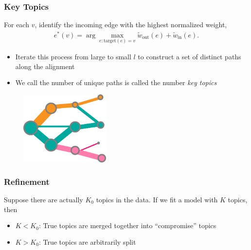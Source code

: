 \documentclass[hyperref={colorlinks=true, linkcolor=violet, citecolor=SeaGreen}]{beamer}
\begin{document}
\begin{frame}
  \frametitle{Key Topics}
  For each $v$, identify the incoming edge with the highest normalized weight,
  \begin{align*}
    e^\ast\left(v\right) = \arg \max_{e : \text{target}\left(e\right) = v} \tilde{w}_{\text{out}}\left(e\right) + \tilde{w}_{\text{in}}\left(e\right).
  \end{align*}
  \begin{itemize}
    \item Iterate this process from large to small $l$ to construct a set of
    distinct paths along the alignment
    \item We call the number of unique paths is called the number \emph{key
    topics}
  \end{itemize}

\begin{figure}
\includegraphics[width=0.4\textwidth]{branch_construction-5}
\end{figure}
\end{frame}


\begin{frame}
  \frametitle{Refinement}
  Suppose there are actually $K_0$ topics in the data. If we fit a model with
  $K$ topics, then
  \begin{itemize}
    \item $K < K_0$: True topics are merged together into ``compromise'' topics
    \item $K > K_0$: True topics are arbitrarily split
  \end{itemize}
\end{frame}
\end{document}
